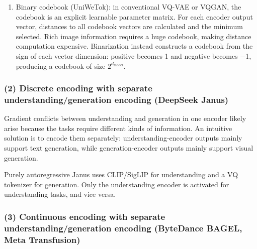 \begin{enumerate}
\def\labelenumi{\arabic{enumi}.}
\setcounter{enumi}{1}
\tightlist
\item
  Binary codebook (UniWeTok): in conventional VQ-VAE or VQGAN, the codebook is an explicit learnable parameter matrix. For each encoder output vector, distances to all codebook vectors are calculated and the minimum selected. Rich image information requires a huge codebook, making distance computation expensive. Binarization instead constructs a codebook from the sign of each vector dimension: positive becomes 1 and negative becomes −1, producing a codebook of size \(2^{d_{\mathrm{model}}}\).
\end{enumerate}

\hypertarget{discrete-encoding-with-separate-understandinggeneration-encoding-deepseek-janus}{%
\subsubsection{(2) Discrete encoding with separate understanding/generation encoding (DeepSeek Janus)}\label{discrete-encoding-with-separate-understandinggeneration-encoding-deepseek-janus}}

Gradient conflicts between understanding and generation in one encoder likely arise because the tasks require different kinds of information. An intuitive solution is to encode them separately: understanding-encoder outputs mainly support text generation, while generation-encoder outputs mainly support visual generation.

Purely autoregressive Janus uses CLIP/SigLIP for understanding and a VQ tokenizer for generation. Only the understanding encoder is activated for understanding tasks, and vice versa.

\hypertarget{continuous-encoding-with-separate-understandinggeneration-encoding-bytedance-bagel-meta-transfusion}{%
\subsubsection{(3) Continuous encoding with separate understanding/generation encoding (ByteDance BAGEL, Meta Transfusion)}\label{continuous-encoding-with-separate-understandinggeneration-encoding-bytedance-bagel-meta-transfusion}}

